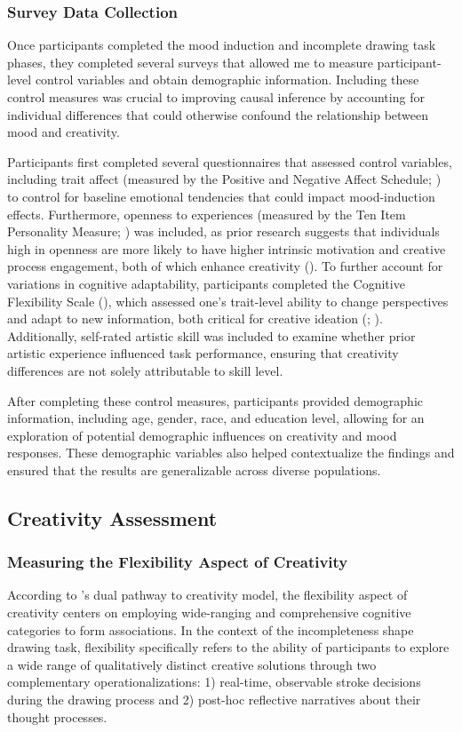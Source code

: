 \documentclass[../MA_Thesis.tex]{subfiles}
\begin{document}
\subsubsection*{Survey Data Collection}
Once participants completed the mood induction and incomplete drawing task phases, they completed several surveys that allowed me to measure participant-level control variables and obtain demographic information. Including these control measures was crucial to improving causal inference by accounting for individual differences that could otherwise confound the relationship between mood and creativity.

Participants first completed several questionnaires that assessed control variables, including trait affect (measured by the Positive and Negative Affect Schedule; \cite{watson_development_1988}) to control for baseline emotional tendencies that could impact mood-induction effects. Furthermore, openness to experiences (measured by the Ten Item Personality Measure; \cite{gosling_very_2003}) was included, as prior research suggests that individuals high in openness are more likely to have higher intrinsic motivation and creative process engagement, both of which enhance creativity (\cite{tan_openness_2019}). To further account for variations in cognitive adaptability, participants completed the Cognitive Flexibility Scale (\cite{martin_new_1995}), which assessed one's trait-level ability to change perspectives and adapt to new information, both critical for creative ideation (\cite{lin_how_2014}; \cite{muller_concentrative_2016}). Additionally, self-rated artistic skill was included to examine whether prior artistic experience influenced task performance, ensuring that creativity differences are not solely attributable to skill level.

After completing these control measures, participants provided demographic information, including age, gender, race, and education level, allowing for an exploration of potential demographic influences on creativity and mood responses. These demographic variables also helped contextualize the findings and ensured that the results are generalizable across diverse populations. 

\subsection*{Creativity Assessment}
\subsubsection*{Measuring the Flexibility Aspect of Creativity}
According to \textcite{nijstad_dual_2010}'s dual pathway to creativity model, the flexibility aspect of creativity centers on employing wide-ranging and comprehensive cognitive categories to form associations. In the context of the incompleteness shape drawing task, flexibility specifically refers to the ability of participants to explore a wide range of qualitatively distinct creative solutions through two complementary operationalizations: 1) real-time, observable stroke decisions during the drawing process and 2) post-hoc reflective narratives about their thought processes.
\end{document}

